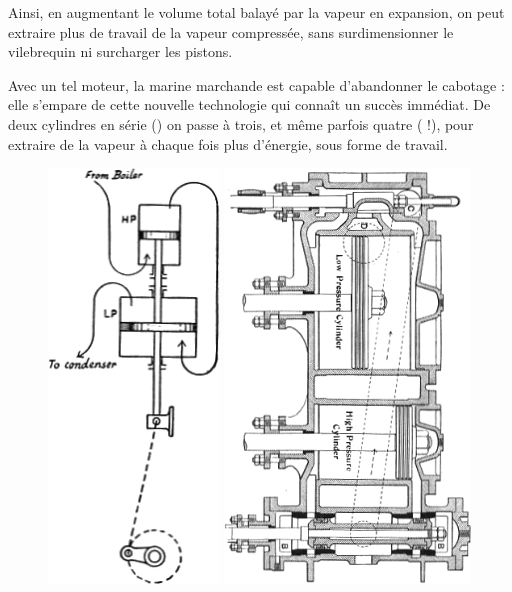 	Ainsi, en augmentant le volume total balayé par la vapeur en expansion, on peut extraire plus de travail de la vapeur compressée, sans surdimensionner le vilebrequin ni surcharger les pistons.

	Avec un tel moteur, la marine marchande est capable d’abandonner le cabotage : elle s’empare de cette nouvelle technologie qui connaît un succès immédiat. De deux cylindres en série () on passe à trois, et même parfois quatre ( !), pour extraire de la vapeur à chaque fois plus d’énergie, sous forme de travail.

	\begin{figure}
		\begin{center}
			\includegraphics[height=11cm, max height=0.55\textheight]{images/ripper_compound_1.png}
			\onlyframabook{\hspace{0.5cm}}
			\includegraphics[height=11cm, max height=0.55\textheight]{images/ripper_compound_2.png}

\end{center}
\end{figure}
